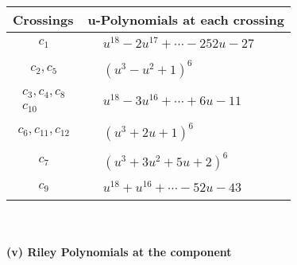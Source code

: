 \documentclass[1p]{elsarticle_modified}
\theoremstyle{definition}
\begin{document}
\begin{tabular}{m{50pt}|m{274pt}}
Crossings & \hspace{64pt}u-Polynomials at each crossing \\
\hline $$\begin{aligned}c_{1}\end{aligned}$$&$\begin{aligned}
&u^{18}-2 u^{17}+\cdots-252 u-27
\end{aligned}$\\
\hline $$\begin{aligned}c_{2},c_{5}\end{aligned}$$&$\begin{aligned}
&(u^3- u^2+1)^6
\end{aligned}$\\
\hline $$\begin{aligned}c_{3},c_{4},c_{8}\\c_{10}\end{aligned}$$&$\begin{aligned}
&u^{18}-3 u^{16}+\cdots+6 u-11
\end{aligned}$\\
\hline $$\begin{aligned}c_{6},c_{11},c_{12}\end{aligned}$$&$\begin{aligned}
&(u^3+2 u+1)^6
\end{aligned}$\\
\hline $$\begin{aligned}c_{7}\end{aligned}$$&$\begin{aligned}
&(u^3+3 u^2+5 u+2)^6
\end{aligned}$\\
\hline $$\begin{aligned}c_{9}\end{aligned}$$&$\begin{aligned}
&u^{18}+u^{16}+\cdots-52 u-43
\end{aligned}$\\
\hline
\end{tabular}\\~\\
\newpage\renewcommand{\arraystretch}{1}
\flushleft \textbf{(v) Riley Polynomials at the component}\newline \\
\end{document}
